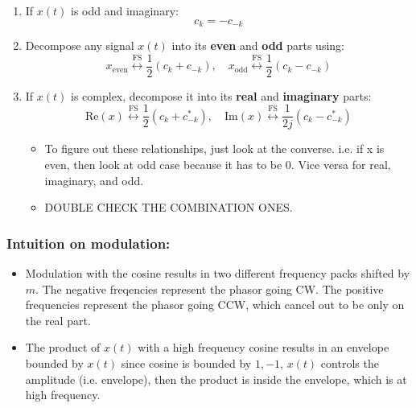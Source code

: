 \begin{intuition}
\begin{enumerate}
        \item If \( x(t) \) is odd and imaginary: 
        \begin{equation*}
            c_k = - c_{-k}
        \end{equation*}

        \item Decompose any signal \(x(t)\) into its \textbf{even} and \textbf{odd} parts using:
            \[
            x_{\text{even}} \overset{\text{FS}}{\longleftrightarrow} \frac{1}{2} (c_k + c_{-k}), \quad x_{\text{odd}} \overset{\text{FS}}{\longleftrightarrow} \frac{1}{2} (c_k - c_{-k})
            \]

        \item  If \(x(t)\) is complex, decompose it into its \textbf{real} and \textbf{imaginary} parts:
        \[
        \text{Re}(x) \overset{\text{FS}}{\longleftrightarrow} \frac{1}{2}(c_k + c_{-k}^*), \quad \text{Im}(x) \overset{\text{FS}}{\longleftrightarrow} \frac{1}{2j}(c_k - c_{-k}^*)
        \]

        \begin{itemize}
            \item To figure out these relationships, just look at the converse. i.e. if x is even, then look at odd case because it has to be 0. Vice versa for real, imaginary, and odd.
            \item DOUBLE CHECK THE COMBINATION ONES.
        \end{itemize}

    \end{enumerate}
    
\end{intuition}

\subsubsection{Intuition on modulation:}
\begin{intuition}
    \begin{itemize}
        \item Modulation with the cosine results in two different frequency packs shifted by $m$. The negative freqencies represent the phasor going CW. The positive frequencies represent the phasor going CCW, which cancel out to be only on the real part.
    \end{itemize}
    \begin{itemize}
        \item The product of $x(t)$ with a high frequency cosine results in an envelope bounded by $x(t)$ since cosine is bounded by $1,-1$, $x(t)$ controls the amplitude (i.e. envelope), then the product is inside the envelope, which is at high frequency.
    \end{itemize}
\end{intuition}

